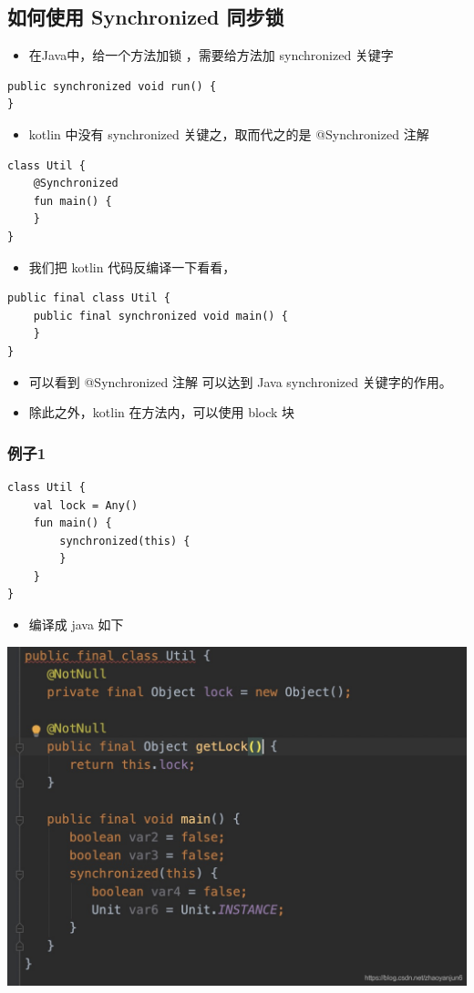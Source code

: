 \documentclass[9pt, b5paper]{article}
\begin{document}
\subsection{如何使用 Synchronized 同步锁}
\label{sec-5-2}
\begin{itemize}
\item 在Java中，给一个方法加锁 ，需要给方法加 synchronized 关键字
\end{itemize}
\begin{verbatim}
public synchronized void run() {
}
\end{verbatim}
\begin{itemize}
\item kotlin 中没有 synchronized 关键之，取而代之的是 @Synchronized 注解
\end{itemize}
\begin{verbatim}
class Util {
    @Synchronized
    fun main() {
    }
}
\end{verbatim}
\begin{itemize}
\item 我们把 kotlin 代码反编译一下看看，
\end{itemize}
\begin{verbatim}
public final class Util {
    public final synchronized void main() {
    }
}
\end{verbatim}
\begin{itemize}
\item 可以看到 @Synchronized 注解 可以达到 Java synchronized 关键字的作用。
\item 除此之外，kotlin 在方法内，可以使用 block 块
\end{itemize}
\subsubsection{例子1}
\label{sec-5-2-1}
\begin{verbatim}
class Util {
    val lock = Any()
    fun main() {
        synchronized(this) {
        }
    }
}
\end{verbatim}
\begin{itemize}
\item 编译成 java 如下
\end{itemize}

\includegraphics[width=.9\linewidth]{./pic/eg1.png}
\end{document}
